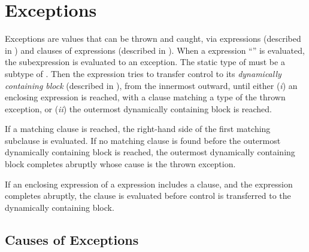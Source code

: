 %
%
%
%

\chapter{Exceptions}


Exceptions are values that can be thrown and caught, via 
expressions (described in )
and  clauses of  expressions (described in
).
When a  expression ``''
is evaluated, the subexpression  is evaluated to an exception.
The static type of  must be a subtype of .
Then the  expression tries to transfer control to
its \emph{dynamically containing block} (described in
), from the innermost outward, until
either (\emph{i}) an enclosing  expression is reached, with a
 clause matching a type of the thrown exception, or (\emph{ii})
the outermost dynamically containing block is reached.

If a matching  clause is reached,
the right-hand side of the first matching subclause is evaluated.  If no
matching  clause is found before the outermost dynamically
containing block is reached, the outermost dynamically containing block
completes abruptly whose cause is the thrown exception.

If an enclosing  expression of a  expression
includes a  clause, and the  expression completes
abruptly, the  clause is evaluated before control is
transferred to the dynamically containing block.


\section{Causes of Exceptions}

